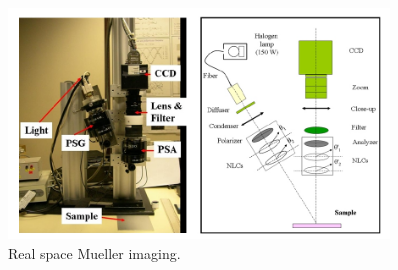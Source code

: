 \documentclass[oneside,a4,12p]{report} %
\begin{document}
	\begin{figure}[h]
	\centering 
	\includegraphics[width = 0.9\textwidth]{figures/RealMuellerImagingSystem.png}	
	\caption{Real space Mueller imaging.\cite{antonelli2011biomedical}}
	\label{fig:RealMueller}
	\end{figure}







\end{document}
